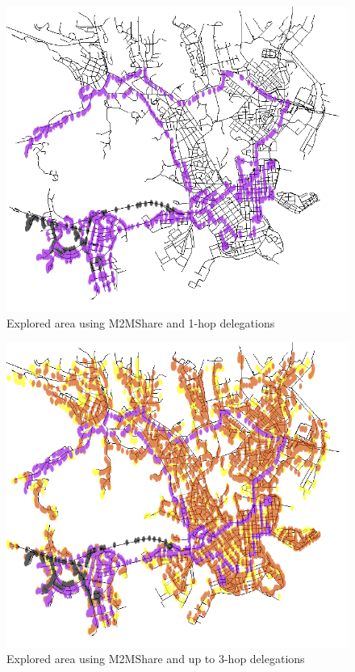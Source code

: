 \begin{figure}[htpb]
  \begin{center}
    \includegraphics[scale=0.35]{figure/mappa_1_hop.png}
    \caption{Explored area using M2MShare and 1-hop delegations}
    \label{mappa1Hop}
  \end{center}
\end{figure}

\begin{figure}[htpb]
  \begin{center}
    \includegraphics[scale=0.35]{figure/mappa_3_hop.png}
    \caption{Explored area using M2MShare and up to 3-hop delegations}
    \label{mappa3Hop}
  \end{center}
\end{figure}


